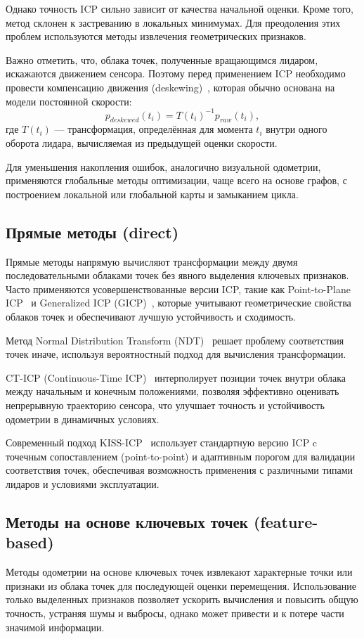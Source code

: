 Однако точность ICP сильно зависит от качества начальной 
оценки. Кроме того, метод склонен к застреванию в локальных минимумах. Для преодоления 
этих проблем используются методы извлечения геометрических признаков.

Важно отметить, что, облака точек, полученные вращающимся лидаром, искажаются движением сенсора. 
Поэтому перед применением ICP необходимо провести компенсацию движения (deskewing)~\cite{he2020skewing}, 
которая обычно основана на модели постоянной скорости:
\begin{equation}
    p_{deskewed}(t_i) = T(t_i)^{-1} p_{raw}(t_i),
\end{equation}
где $T(t_i)$ --- трансформация, определённая для момента $t_i$ внутри одного оборота 
лидара, вычисляемая из предыдущей оценки скорости.

Для уменьшения накопления ошибок, аналогично визуальной одометрии, применяются
глобальные методы оптимизации, чаще всего на основе графов, с построением 
локальной или глобальной карты и замыканием цикла.

\subsection{Прямые методы (direct)}
Прямые методы напрямую вычисляют трансформации между двумя последовательными 
облаками точек без явного выделения ключевых признаков. Часто применяются усовершенствованные версии 
ICP, такие как Point-to-Plane ICP~\cite{low2004linear} и Generalized ICP (GICP)~\cite{segal2009generalized}, которые учитывают 
геометрические свойства облаков точек и обеспечивают лучшую устойчивость 
и сходимость.

Метод Normal Distribution Transform (NDT)~\cite{zhou2021ndt} решает проблему соответствия точек 
иначе, используя вероятностный подход для вычисления 
трансформации. 

CT-ICP (Continuous-Time ICP)~\cite{dellenbach2022ct} интерполирует позиции точек внутри облака между 
начальным и конечным положениями, позволяя эффективно оценивать непрерывную 
траекторию сенсора, что улучшает точность и устойчивость одометрии в динамичных 
условиях.

Современный подход KISS-ICP~\cite{vizzo2023kiss} использует стандартную версию ICP c точечным сопоставлением 
(point-to-point) и адаптивным порогом для валидации соответствия точек, обеспечивая 
возможность применения с различными типами лидаров и условиями эксплуатации.


\subsection{Методы на основе ключевых точек (feature-based)}
Методы одометрии на основе ключевых точек извлекают характерные точки или 
признаки из облака точек для последующей оценки 
перемещения. Использование только выделенных признаков позволяет ускорить 
вычисления и повысить общую точность, устраняя шумы и выбросы, однако может привести
и к потере части значимой информации.

